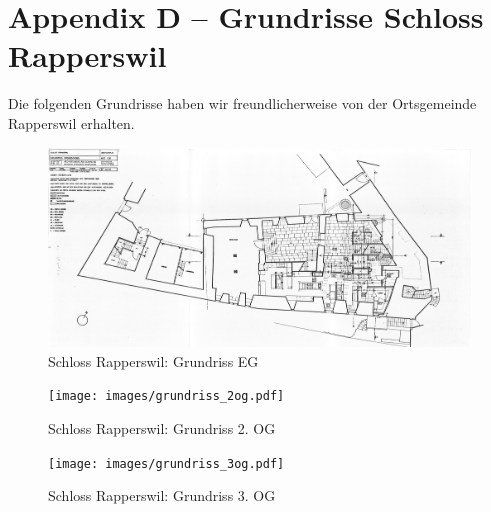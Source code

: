 \chapter{Appendix D -- Grundrisse Schloss Rapperswil}

\label{ch:groundplan}

Die folgenden Grundrisse haben wir freundlicherweise von der Ortsgemeinde
Rapperswil erhalten.

\begin{figure}[H]
	\centering
	\includegraphics[width=0.75\textheight,angle=90]{images/grundriss_eg.pdf}
	\caption{Schloss Rapperswil: Grundriss EG}
	\label{img:groundplan:eg}
\end{figure}

\begin{figure}[H]
	\centering
	\texttt{[image: images/grundriss\_2og.pdf]}
	\caption{Schloss Rapperswil: Grundriss 2. OG}
	\label{img:groundplan:2og}
\end{figure}

\begin{figure}[H]
	\centering
	\texttt{[image: images/grundriss\_3og.pdf]}
	\caption{Schloss Rapperswil: Grundriss 3. OG}
	\label{img:groundplan:3og}
\end{figure}
